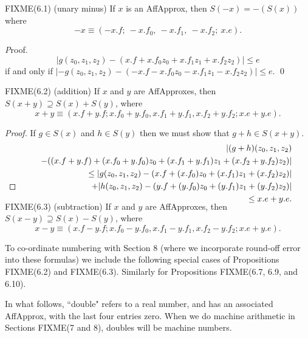 \begin{proposition}{FIXME(6.1) {\textrm (unary minus)}} If $x$ is an {\textrm AffApprox,} then 
$S(-x) = -(S(x))$ where 
$$-x \equiv (-x.f;\ -x.f_0,\ -x.f_1,\ -x.f_2;\ x.e).$$ 
\end{proposition}

{\textit Proof}.
$$|g(z_0,z_1,z_2) - (x.f + x.f_0 z_0 + x.f_1 z_1 + x.f_2 z_2)| \le e$$
if and only if 
\hfill $|-g(z_0,z_1,z_2) - (-x.f - x.f_0 z_0 - x.f_1 z_1 - x.f_2 z_2)| \le e.$ \hfill\qed


\begin{proposition}{FIXME(6.2) {\textrm (addition)}} \hskip-8pt If $x$ and $y$ are {\textrm AffApproxes,} then $S(x + y) \supseteq S(x)
+ S(y)${\textrm ,} where
$$x + y \equiv (x.f + y.f; x.f_0 + y.f_0, x.f_1 + y.f_1, x.f_2 + y.f_2; x.e + y.e).$$
\end{proposition}  

\begin{proof}{}  If $g\in S(x)$ and $h \in S(y)$ then we must show that $g + h \in S(x + y).$
\begin{eqnarray*}
&&|(g + h)(z_0,z_1,z_2) \\
&&\quad- ((x.f + y.f) + (x.f_0 + y.f_0) z_0 + (x.f_1 + y.f_1) z_1 + (x.f_2 + y.f_2) z_2)| \\
&&\qquad 
\le |g(z_0,z_1,z_2) - 
(x.f + (x.f_0) z_0 + (x.f_1) z_1 + (x.f_2) z_2)| \\
&&\quad\qquad + 
|h(z_0,z_1,z_2) - (y.f + (y.f_0) z_0 + (y.f_1) z_1 + (y.f_2) z_2)| 
                                        \\
&&\qquad \le x.e + y.e.\\
\noalign{\vskip-36pt}
\end{eqnarray*}
\end{proof}

\begin{proposition}{FIXME(6.3) {\textrm (subtraction)}} \hskip-8pt If $x$ and $y$ are {\textrm AffApproxes,} then $S(x - y) \supseteq
S(x) - S(y)${\textrm ,}
 where
$$x - y \equiv (x.f - y.f; x.f_0 - y.f_0, x.f_1 - y.f_1, x.f_2 - y.f_2; x.e + y.e).$$ 
\end{proposition}

To co-ordinate numbering with Section 8 (where we incorporate round-off error into these formulas) we include the following special
cases of Propositions FIXME(6.2) and FIXME(6.3).  Similarly for Propositions FIXME(6.7, 6.9, and 6.10). 

In what follows,  ``double" refers to a real number, and has an associated AffApprox, with the last four entries zero.  When we do
machine arithmetic in Sections FIXME(7 and 8), doubles will be  machine numbers.

